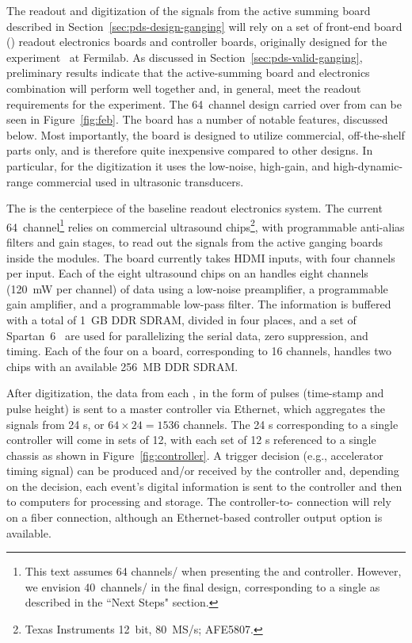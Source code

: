 The readout and digitization of the signals from the active summing board described in Section~\ref{sec:pds-design-ganging} will rely on a set of front-end board () readout electronics boards and controller boards, originally designed for the  experiment~\cite{bib:mu2e_tdr}
at Fermilab. As discussed in Section~\ref{sec:pds-valid-ganging}, preliminary results indicate that the active-summing board and  electronics  combination will perform well together and, in general, meet the readout requirements for the experiment. The 64~channel  design carried over from  can be seen in Figure~\ref{fig:feb}. The board has a number of notable features, discussed below. Most importantly, %
the board is designed to utilize commercial, off-the-shelf parts only, and is therefore quite inexpensive compared to other designs. In particular, for the digitization it uses the low-noise, high-gain, and high-dynamic-range commercial  used in ultrasonic transducers. 

The  is the centerpiece of the baseline readout electronics system.  
The current 64~channel\footnote{This text assumes 64 channels/ when presenting the  and controller. However, we envision 40~channels/ in the final design, corresponding to a single  as described in the ``Next Steps" section.}  relies on commercial ultrasound chips\footnote{Texas Instruments\texttrademark{} 12~bit, 80~MS/s; AFE5807.},
with programmable anti-alias filters and gain stages, to read out the  signals from the active ganging boards inside the  modules. The board currently takes HDMI inputs, with four channels per input.  Each of the eight ultrasound chips on an  handles eight channels (\SI{120}{mW} per channel) of data using a low-noise preamplifier, a programmable gain amplifier, and a programmable low-pass filter. The information is buffered with a total of \SI{1}{GB} DDR SDRAM, divided in four places, and a set of Spartan~6\texttrademark~ are used for parallelizing the serial  data, zero suppression, and timing. Each of the four  on a board, corresponding to 16 channels, handles two  chips with an available \SI{256}{MB} DDR SDRAM. 

After digitization, the data from each , in the form of pulses (time-stamp and pulse height) is sent to a master controller via Ethernet, which aggregates the signals from 24 s, or $64 \times 24=1536$ channels. The 24 s corresponding to a single controller will come in sets of 12, with each set of 12 s referenced to a single chassis as shown in %
Figure~\ref{fig:controller}. A trigger decision (e.g., accelerator timing signal) can be produced and/or received by the controller and, depending on the decision, each event's digital information is sent to the controller and then to  computers for processing and storage. The controller-to- connection will rely on a fiber connection, although an Ethernet-based controller output option is available.

